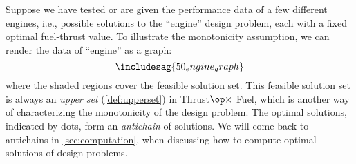 \begin{example}
Suppose we have tested or are given the performance data of a few different engines, i.e., possible solutions to the ``engine'' design problem, each with a fixed optimal fuel-thrust value. To illustrate the monotonicity assumption, we can render the data of ``engine'' as a graph:
%
\begin{equation*}
\centering
\includesag{50_engine_graph}
\end{equation*}
%
where the shaded regions cover the feasible solution set. This feasible solution set is always an \emph{upper set} (\cref{def:upperset}) in Thrust$\op \times$ Fuel, which is another way of characterizing the monotonicity of the design problem. The optimal solutions, indicated by dots, form an \emph{antichain} of solutions. We will come back to antichains in \cref{sec:computation}, when discussing how to compute optimal solutions of design problems.
\end{example}



